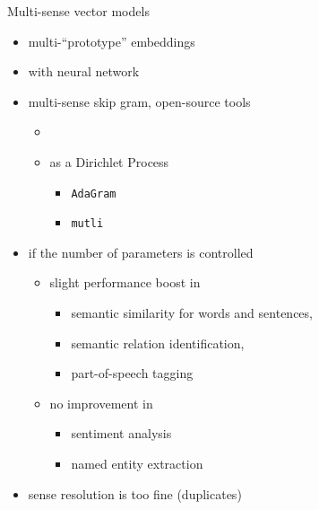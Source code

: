 \documentclass[10pt]{beamer}%
\newcommand{\adagram}{\texttt{AdaGram}}
\newcommand{\mutli}{\texttt{mutli}}
\begin{document}
\begin{frame}{Multi-sense vector models}
  \begin{itemize}
    \item multi-``prototype'' embeddings \citep{Reisinger:2010}
    \item with neural network \citep{Huang:2012}
    \item multi-sense skip gram, open-source tools
      \begin{itemize}
        \item \cite{Neelakantan:2014}
        \item as a Dirichlet Process
          \begin{itemize}
            \item \adagram~\citep{Bartunov:2015}
            \item \mutli~\citep{Li:2015}
          \end{itemize}
      \end{itemize}
    \item if the number of parameters is controlled \citep{Li:2015}
      \begin{itemize}
        \item slight performance boost in
          \begin{itemize}
            \item semantic similarity for words and sentences,
            \item semantic relation identification,
            \item part-of-speech tagging
          \end{itemize}
        \item no improvement in
          \begin{itemize}
            \item sentiment analysis
            \item named entity extraction
          \end{itemize}
      \end{itemize}
    \item sense resolution is too fine (duplicates)
  \end{itemize}
\end{frame}


\end{document}
